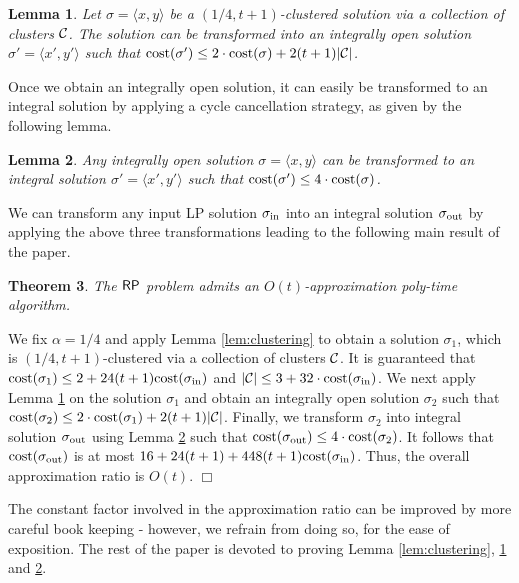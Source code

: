 \documentclass[11pt]{article}
\newtheorem{theorem}{Theorem}[section]
\newtheorem{lemma}[theorem]{Lemma}
\newcommand{\calC} {{\cal C}}
\newcommand{\myin} {{\rm in}}
\newcommand{\sigmain} {\sigma_{\myin}}
\newcommand{\sigmaout} {\sigma_{\out}}
\newcommand{\pair}[2] {\langle #1, #2\rangle}
\newcommand{\out} {{\rm out}}
\newcommand{\cost} {{\rm cost}}
\newcommand{\RP} {{\sf RP}}
\newcommand{\qed} {\hfill$\Box$}
\begin{document}
\begin{lemma}
	\label{lem:part2}
	Let $\sigma = \pair{x}{y}$ be a $(1/4,t+1)$-clustered solution via a collection of clusters $\calC$.
	The solution can be transformed into an integrally open solution $\sigma' =\pair{x'}{y'}$ 
	such that $\cost(\sigma') \leq 2\cdot \cost(\sigma) + 2(t+1)|\calC|$.
\end{lemma}

Once we obtain an integrally open solution, it can easily be transformed to an integral solution
by applying a cycle cancellation strategy, as given by the following lemma. 

\begin{lemma}
	\label{lem:integral}
	Any integrally open solution $\sigma = \pair{x}{y}$ can be transformed to an integral solution $\sigma' = \pair{x'}{y'}$
	such that $\cost(\sigma') \leq 4\cdot \cost(\sigma)$.
\end{lemma}

We can transform any input LP solution $\sigmain$ into an integral solution $\sigmaout$ by applying the above three transformations
leading to the following main result of the paper. 

\begin{theorem}
\label{thm:mainthm}
The $\RP$ problem admits an $O(t)$-approximation poly-time algorithm.
\end{theorem}
\proof
We fix $\alpha = 1/4$ and apply Lemma \ref{lem:clustering} to obtain a 
solution $\sigma_1$, which is $(1/4, t+1)$-clustered via a collection of clusters $\calC$.
It is guaranteed that $\cost(\sigma_1) \leq 2 + 24(t+1)\cost(\sigmain)$ and $|\calC|\leq 3+ 32\cdot \cost(\sigmain)$.
We next apply Lemma \ref{lem:part2} on the solution $\sigma_1$ and obtain an integrally open solution
$\sigma_2$ such that $\cost(\sigma_2) \leq 2\cdot \cost(\sigma_1) + 2(t+1)|\calC|$.
Finally, we transform $\sigma_2$ into integral solution $\sigmaout$ using Lemma \ref{lem:integral}
such that $\cost(\sigmaout) \leq 4\cdot \cost(\sigma_2)$.
It follows that $\cost(\sigmaout)$ is at most $16 + 24(t+1) + 448(t+1)\cost(\sigmain)$.
Thus, the overall approximation ratio is $O(t)$. 
\qed

The constant factor involved in the approximation ratio can be improved by more careful book keeping -
however, we refrain from doing so, for the ease of exposition.
The rest of the paper is devoted to proving Lemma \ref{lem:clustering}, \ref{lem:part2} and \ref{lem:integral}.
\end{document}
